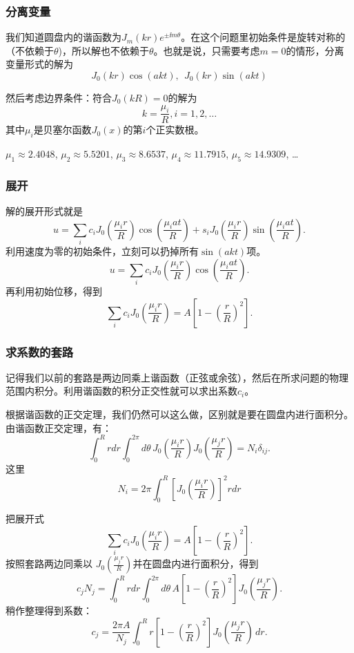 \documentclass[CJK]{beamer}
\begin{document}
\begin{frame}
  \frametitle{分离变量}
  
  我们知道圆盘内的谐函数为$J_m(kr)e^{\pm \ii m\theta}$。在这个问题里初始条件是旋转对称的（不依赖于$\theta$)，所以解也不依赖于$\theta$。也就是说，只需要考虑$m=0$的情形，分离变量形式的解为
    $$J_0(kr)\cos (akt),\  \  J_0(kr)\sin(akt)$$
    


    然后考虑边界条件：符合$J_0(kR) = 0$的解为
    $$ k = \frac{\mu_i}{R}, i = 1,2,\ldots $$
    其中$\mu_i$是贝塞尔函数$J_0(x)$的第$i$个正实数根。

    
$\mu_1\approx 2.4048$, $\mu_2 \approx 5.5201$, $\mu_3 \approx 8.6537$, $\mu_4 \approx 11.7915$, $\mu_5\approx 14.9309$, \ldots	

    
  
\end{frame}




\begin{frame}
  \frametitle{展开}
  
  解的展开形式就是
  $$u = \sum_i c_i J_0\left(\frac{\mu_ir}{R}\right) \cos\left(\frac{\mu_iat}{R}\right) + s_i J_0\left(\frac{\mu_ir}{R}\right) \sin\left(\frac{\mu_iat}{R}\right). $$  
  利用速度为零的初始条件，立刻可以扔掉所有$\sin(akt)$项。
  $$u = \sum_i c_i J_0\left(\frac{\mu_ir}{R}\right) \cos\left(\frac{\mu_iat}{R}\right). $$
  再利用初始位移，得到
  $$\sum_i c_i J_0\left(\frac{\mu_ir}{R}\right) =  A\left[1-\left(\frac{r}{R}\right)^2\right]. $$  
  
\end{frame}


\begin{frame}
  \frametitle{求系数的套路}
  
  记得我们以前的套路是两边同乘上谐函数（正弦或余弦），然后在所求问题的物理范围内积分。利用谐函数的积分正交性就可以求出系数$c_i$。

  \skipline
  根据谐函数的正交定理，我们仍然可以这么做，区别就是要在圆盘内进行面积分。由谐函数正交定理，有：
  $$\int_0^R r dr\int_0^{2\pi} d\theta\, J_0\left(\frac{\mu_ir}{R}\right) J_0\left(\frac{\mu_jr}{R}\right) = N_i \delta_{ij}. $$
  这里
  $$N_i = 2\pi \int_0^R\left[ J_0\left(\frac{\mu_ir}{R}\right) \right]^2  r dr$$
\end{frame}


\begin{frame}
  把展开式
  $$\sum_i c_i J_0\left(\frac{\mu_ir}{R}\right) =  A\left[1-\left(\frac{r}{R}\right)^2\right]. $$  
  按照套路两边同乘以 $J_0\left(\frac{\mu_jr}{R}\right)$并在圆盘内进行面积分，得到
  $$ c_j N_j = \int_0^Rrdr\int_0^{2\pi}d\theta\, A\left[1-\left(\frac{r}{R}\right)^2\right]J_0\left(\frac{\mu_jr}{R}\right). $$
  稍作整理得到系数：
  $$ c_j = \frac{2\pi A}{N_j}\int_0^R r\left[1-\left(\frac{r}{R}\right)^2\right]J_0\left(\frac{\mu_jr}{R}\right)\, dr. $$  
\end{frame}
\end{document}
